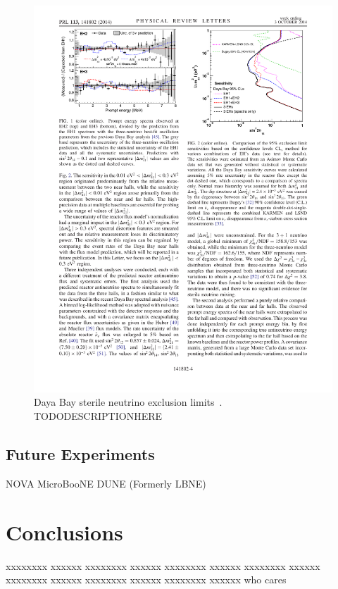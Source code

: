 \documentclass[aps,prd,twocolumn,nofootinbib]{revtex4-1}
\begin{document}
\begin{figure}[H]
 \centering
 \includegraphics[width=1\columnwidth]{../figures/daya1.pdf}
 \caption{Daya Bay sterile neutrino exclusion limits~\cite{DayaBay}. TODODESCRIPTIONHERE}
 \label{fig:DayaBay}
\end{figure}


\subsection{Future Experiments}
NOVA
MicroBooNE
DUNE (Formerly LBNE)


\section{Conclusions}
xxxxxxxx xxxxxx xxxxxxxx xxxxxx xxxxxxxx xxxxxx xxxxxxxx xxxxxx xxxxxxxx xxxxxx xxxxxxxx xxxxxx xxxxxxxx xxxxxx
who cares
\end{document}
